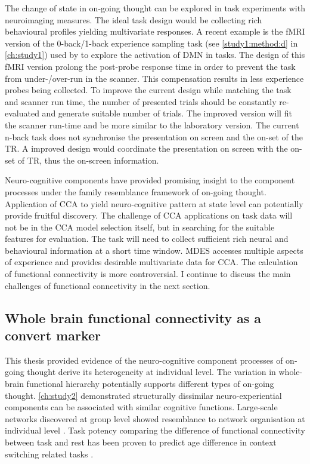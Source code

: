 The change of state in on-going thought can be explored in task experiments with neuroimaging measures. The ideal task design would be collecting rich behavioural profiles yielding multivariate responses. A recent example is the fMRI version of the 0-back/1-back experience sampling task (see \cref{study1:method:d} in \cref{ch:study1}) used by  to explore the activation of DMN in tasks. The design of this fMRI version prolong the post-probe response time in order to prevent the task from under-/over-run in the scanner. This compensation results in less experience probes being collected. To improve the current design while matching the task and scanner run time, the number of presented trials should be constantly re-evaluated and generate suitable number of trials. The improved version will fit the scanner run-time and be more similar to the laboratory version. The current n-back task does not synchronise the presentation on screen and the on-set of the TR. A improved design would coordinate the presentation on screen with the on-set of TR, thus the on-screen information. 

Neuro-cognitive components have provided promising insight to the component processes under the family resemblance framework of on-going thought. Application of CCA to yield neuro-cognitive pattern at state level can potentially provide fruitful discovery. The challenge of CCA applications on task data will not be in the CCA model selection itself, but in searching for the suitable features for evaluation. The task will need to collect sufficient rich neural and behavioural information at a short time window. MDES accesses multiple aspects of experience and provides desirable multivariate data for CCA. The calculation of functional connectivity is more controversial. I continue to discuss the main challenges of functional connectivity in the next section.

\subsection{Whole brain functional connectivity as a convert marker}

This thesis provided evidence of the neuro-cognitive component processes of on-going thought derive its heterogeneity at individual level. The variation in whole-brain functional hierarchy potentially supports different types of on-going thought. \cref{ch:study2} demonstrated structurally dissimilar neuro-experiential components can be associated with similar cognitive functions\cite{Buckner2013}. Large-scale networks discovered at group level showed resemblance to network organisation at individual level \cite{Finn2015}. Task potency comparing the difference of functional connectivity between task and rest has been proven to predict age difference in context switching related tasks \cite{Chauvin2018}. 


